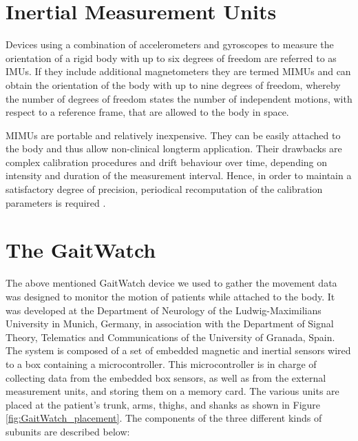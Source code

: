 \section{Inertial Measurement Units}

Devices using a combination of accelerometers and gyroscopes to measure the orientation of a rigid body with up to six degrees of freedom are referred to as \glspl{IMU}. If they include additional magnetometers they are termed \glspl{MIMU} and can obtain the orientation of the body with up to nine degrees of freedom, whereby the number of degrees of freedom states the number of independent motions, with respect to a reference frame, that are allowed to the body in space.

\glspl{MIMU} are portable and relatively inexpensive. They can be easily attached to the body and thus allow non-clinical longterm application. Their drawbacks are complex calibration procedures and drift behaviour over time, depending on intensity and duration of the measurement interval. Hence, in order to maintain a satisfactory degree of precision, periodical recomputation of the calibration parameters is required \cite{olivares_vicente_signal_2013}.

\section{The GaitWatch}

The above mentioned GaitWatch device we used to gather the movement data was designed to monitor the motion of patients while attached to the body. It was developed at the Department of Neurology of the Ludwig-Maximilians University in Munich, Germany, in association with the Department of Signal Theory, Telematics and Communications of the University of Granada, Spain. The system is composed of a set of embedded magnetic and inertial sensors wired to a box containing a microcontroller. This microcontroller is in charge of collecting data from the embedded box sensors, as well as from the external measurement units, and storing them on a memory card. The various units are placed at the patient's trunk, arms, thighs, and shanks as shown in Figure \ref{fig:GaitWatch_placement}. The components of the three different kinds of subunits are described below:


